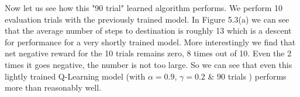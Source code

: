 \documentclass[paper=a4, fontsize=11pt]{scrartcl}
\numberwithin{equation}{section}		%
\numberwithin{figure}{section}			%
\numberwithin{table}{section}				%
\begin{document}
Now let us see how this "90 trial" learned algorithm performs. We perform 10 evaluation trials with the previously trained model. In Figure 5.3(a) we can see that the average number of steps to destination is roughly 13 which is a descent for performance for a very shortly trained model.  More interestingly we find that net negative reward for the 10 trials remains zero, 8 times out of 10. Even the 2 times it goes negative, the number is not too large. So we can see that even this lightly trained Q-Learning model (with $\alpha = 0.9$, $\gamma = 0.2$ \& $90$ trials ) performs more than reasonably well.
	  
	  
\end{document}
